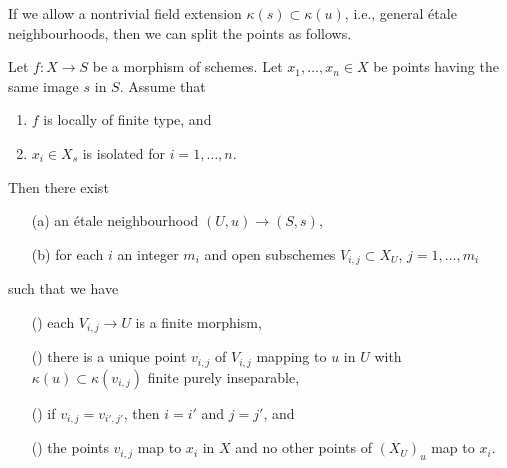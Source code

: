 \noindent
If we allow a nontrivial field extension $\kappa(s) \subset \kappa(u)$, i.e.,
general \'etale neighbourhoods, then we can split the points as follows.

\begin{lemma}
\label{lemma-etale-makes-quasi-finite-finite-multiple-points-var}
Let $f : X \to S$ be a morphism of schemes.
Let $x_1, \ldots, x_n \in X$ be points having the same image $s$ in $S$.
Assume that
\begin{enumerate}
\item $f$ is locally of finite type, and
\item $x_i \in X_s$ is isolated for $i = 1, \ldots, n$.
\end{enumerate}
Then there exist
\begin{enumerate}
\item[(a)] an \'etale neighbourhood $(U, u) \to (S, s)$,
\item[(b)] for each $i$ an integer $m_i$ and
open subschemes $V_{i, j} \subset X_U$, $j = 1, \ldots, m_i$
\end{enumerate}
such that we have
\begin{enumerate}
\item[(\romannumeral1)] each $V_{i, j} \to U$ is a finite morphism,
\item[(\romannumeral2)] there is a unique point $v_{i, j}$ of $V_{i, j}$
mapping to $u$ in $U$ with $\kappa(u) \subset \kappa(v_{i, j})$
finite purely inseparable,
\item[(\romannumeral4)] if $v_{i, j} = v_{i', j'}$, then $i = i'$ and
$j = j'$, and
\item[(\romannumeral3)] the points $v_{i, j}$ map to $x_i$ in $X$ and
no other points of $(X_U)_u$ map to $x_i$.
\end{enumerate}
\end{lemma}

